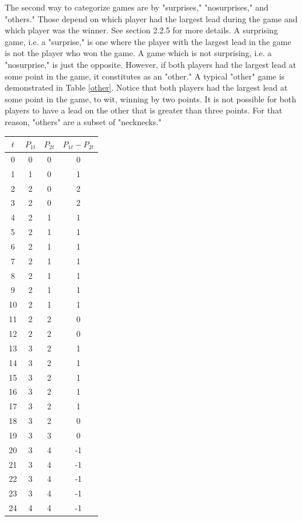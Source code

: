 \documentclass{article}
\begin{document}
The second way to categorize games are by "surprises," "nosurprises," and "others." Those depend on which player had the largest lead during the game and which player was the winner. See section 2.2.5 for more details. A surprising game, i.e. a "surprise," is one where the player with the largest lead in the game is not the player who won the game. A game which is not surprising, i.e. a "nosurprise," is just the opposite. However, if both players had the largest lead at some point in the game, it constitutes as an "other." A typical "other" game is demonstrated in Table \ref{other}. Notice that both players had the largest lead at some point in the game, to wit, winning by two points. It is not possible for both players to have a lead on the other that is greater than three points. For that reason, "others" are a subset of "necknecks." 
\begin{table}[h!]
	\centering
	\begin{tabular}{||c c c c||} 
		\hline
		$t$ & $P_{1t}$ & $P_{2t}$ & $P_{1t} - P_{2t}$ \\ [0.5ex] 
		\hline\hline
		0 & 0 & 0 & 0 \\
		1 & 1 & 0 & 1 \\ 
		2 & 2 & 0 & 2 \\
		3 & 2 & 0 & 2 \\
		4 & 2 & 1 & 1 \\
		5 & 2 & 1 & 1 \\
		6 & 2 & 1 & 1 \\ 
		7 & 2 & 1 & 1 \\
		8 & 2 & 1 & 1 \\
		9 & 2 & 1 & 1 \\
		10 & 2 & 1 & 1 \\
		11 & 2 & 2 & 0 \\ 
		12 & 2 & 2 & 0 \\
		13 & 3 & 2 & 1 \\
		14 & 3 & 2 & 1 \\
		15 & 3 & 2 & 1 \\
		16 & 3 & 2 & 1 \\ 
		17 & 3 & 2 & 1 \\
		18 & 3 & 2 & 0 \\
		19 & 3 & 3 & 0 \\
		20 & 3 & 4 & -1 \\
		21 & 3 & 4 & -1 \\ 
		22 & 3 & 4 & -1 \\
		23 & 3 & 4 & -1 \\
		24 & 4 & 4 & -1 \\

\end{tabular}
\end{table}
\end{document}
